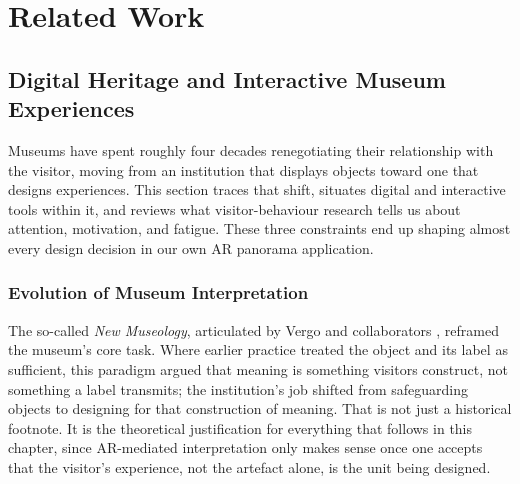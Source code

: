 
%

\chapter{Related Work}
\label{ch:related-work}


\section{Digital Heritage and Interactive Museum Experiences}
\label{sec:rw-heritage}

Museums have spent roughly four decades renegotiating their relationship
with the visitor, moving from an institution that displays objects toward
one that designs experiences. This section traces that shift, situates
digital and interactive tools within it, and reviews what visitor-behaviour
research tells us about attention, motivation, and fatigue. These three
constraints end up shaping almost every design decision in our own AR
panorama application.

\subsection{Evolution of Museum Interpretation}
\label{subsec:rw-museum-evolution}

The so-called \emph{New Museology}, articulated by Vergo and collaborators
\cite{vergo1989}, reframed the museum's core task. Where earlier practice
treated the object and its label as sufficient, this paradigm argued that
meaning is something visitors construct, not something a label transmits;
the institution's job shifted from safeguarding objects to designing for
that construction of meaning. That is not just a historical footnote. It
is the theoretical justification for everything that follows in this
chapter, since AR-mediated interpretation only makes sense once one
accepts that the visitor's experience, not the artefact alone, is the
unit being designed.

